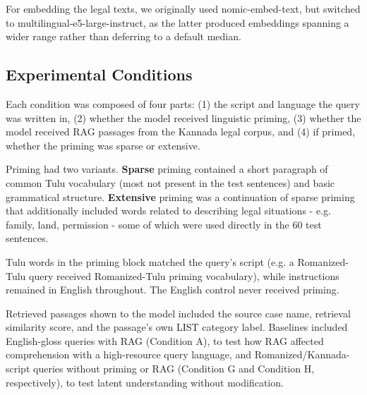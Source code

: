 \documentclass[11pt]{article}
\begin{document}
For embedding the legal texts, we originally used nomic-embed-text, but switched to multilingual-e5-large-instruct, as the latter produced embeddings spanning a wider range rather than deferring to a default median.

\subsection{Experimental Conditions}
\label{subsec:experimental-conditions}
Each condition was composed of four parts: (1) the script and language the query was written in, (2) whether the model received linguistic priming, (3) whether the model received RAG passages from the Kannada legal corpus, and (4) if primed, whether the priming was sparse or extensive.

Priming had two variants. \textbf{Sparse} priming contained a short paragraph of common Tulu vocabulary (most not present in the test sentences) and basic grammatical structure. \textbf{Extensive} priming was a continuation of sparse priming that additionally included words related to describing legal situations - e.g. family, land, permission - some of which were used directly in the 60 test sentences.

Tulu words in the priming block matched the query's script (e.g. a Romanized-Tulu query received Romanized-Tulu priming vocabulary), while instructions remained in English throughout. The English control never received priming.

Retrieved passages shown to the model included the source case name, retrieval similarity score, and the passage's own LIST category label. Baselines included English-gloss queries with RAG (Condition A), to test how RAG affected comprehension with a high-resource query language, and Romanized/Kannada-script queries without priming or RAG (Condition G and Condition H, respectively), to test latent understanding without modification.
\end{document}
